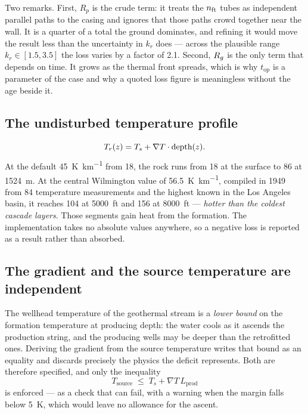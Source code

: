 Two remarks. First, $R_p$ is the crude term: it treats the $n_{\mathrm{ft}}$ tubes as
independent parallel paths to the casing and ignores that those paths crowd
together near the wall. It is a quarter of a total the ground dominates, and
refining it would move the result less than the uncertainty in $k_r$ does ---
across the plausible range $k_r \in [1.5, 3.5]$ the loss varies by a factor of
2.1. Second, $R_{g}$ is the only term that depends on time. It grows as the
thermal front spreads, which is why $t_{\mathrm{op}}$ is a parameter of the
case and why a quoted loss figure is meaningless without the age beside it.

\subsection{The undisturbed temperature profile}

\begin{equation}
T_{r}(z) = T_s + \nabla T \cdot \text{depth}(z).
\end{equation}
At the default \SI{45}{\kelvin\per\kilo\metre} from \SI{18}{\degC}, the rock
runs from \SI{18}{\degC} at the surface to \SI{86}{\degC} at
\SI{1524}{\metre}. At the central Wilmington value of
\SI{56.5}{\kelvin\per\kilo\metre}, compiled in 1949 from 84 temperature
measurements and the highest known in the Los Angeles basin, it reaches
\SI{104}{\degC} at \SI{5000}{ft} and \SI{156}{\degC} at \SI{8000}{ft} ---
\emph{hotter than the coldest cascade layers}. Those segments gain heat from
the formation. The implementation takes no absolute values anywhere, so a
negative loss is reported as a result rather than absorbed.

\subsection{The gradient and the source temperature are independent}

The wellhead temperature of the geothermal stream is a \emph{lower bound} on
the formation temperature at producing depth: the water cools as it ascends
the production string, and the producing wells may be deeper than the
retrofitted ones. Deriving the gradient from the source temperature writes
that bound as an equality and discards precisely the physics the deficit
represents. Both are therefore specified, and only the inequality
\begin{equation}
T_{\mathrm{source}} \;\le\; T_s + \nabla T\, L_{\mathrm{prod}}
\end{equation}
is enforced --- as a check that can fail, with a warning when the margin falls
below \SI{5}{\kelvin}, which would leave no allowance for the ascent.

